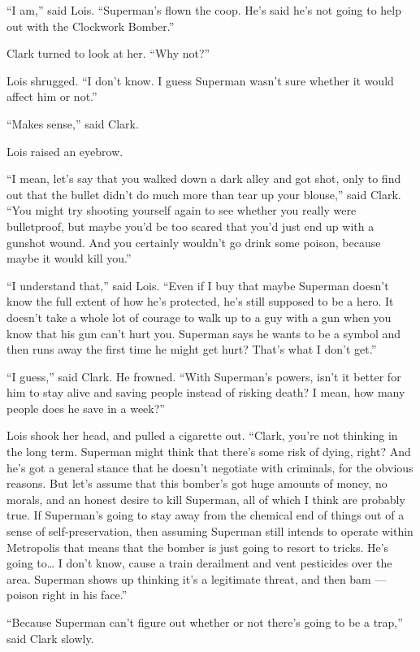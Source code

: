 ``I am,'' said Lois. ``Superman's flown the coop. He's said he's not
going to help out with the Clockwork Bomber.''

Clark turned to look at her. ``Why not?''

Lois shrugged. ``I don't know. I guess Superman wasn't sure whether it
would affect him or not.''

``Makes sense,'' said Clark.

Lois raised an eyebrow.

``I mean, let's say that you walked down a dark alley and got shot, only
to find out that the bullet didn't do much more than tear up your
blouse,'' said Clark. ``You might try shooting yourself again to see
whether you really were bulletproof, but maybe you'd be too scared that
you'd just end up with a gunshot wound. And you certainly wouldn't go
drink some poison, because maybe it would kill you.''

``I understand that,'' said Lois. ``Even if I buy that maybe Superman
doesn't know the full extent of how he's protected, he's still supposed
to be a hero. It doesn't take a whole lot of courage to walk up to a guy
with a gun when you know that his gun can't hurt you. Superman says he
wants to be a symbol and then runs away the first time he might get
hurt? That's what I don't get.''

``I guess,'' said Clark. He frowned. ``With Superman's powers, isn't it
better for him to stay alive and saving people instead of risking death?
I mean, how many people does he save in a week?''

Lois shook her head, and pulled a cigarette out. ``Clark, you're not
thinking in the long term. Superman might think that there's some risk
of dying, right? And he's got a general stance that he doesn't negotiate
with criminals, for the obvious reasons. But let's assume that this
bomber's got huge amounts of money, no morals, and an honest desire to
kill Superman, all of which I think are probably true. If Superman's
going to stay away from the chemical end of things out of a sense of
self‐preservation, then assuming Superman still intends to operate
within Metropolis that means that the bomber is just going to resort to
tricks. He's going to\ldots{} I don't know, cause a train derailment and
vent pesticides over the area. Superman shows up thinking it's a
legitimate threat, and then bam --- poison right in his face.''

``Because Superman can't figure out whether or not there's going to be a
trap,'' said Clark slowly.

